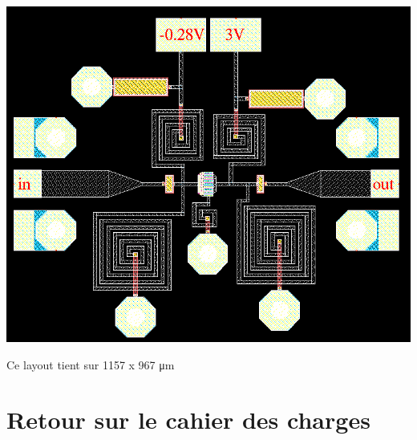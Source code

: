 \documentclass{article}
\begin{document}
\begin{centering}
\includegraphics[width=\linewidth]{layout_fini.png}

Ce layout tient sur 1157 x 967 \si{\micro\meter}

\newpage
\section{Retour sur le cahier des charges}


\end{centering}
\end{document}
